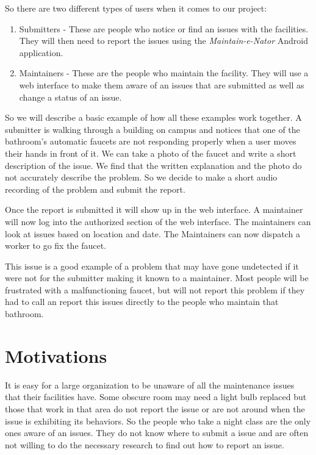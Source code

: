 \documentclass{acm_proc_article-sp}
\begin{document}
So there are two different types of users when it comes to our project:
\vspace{-7mm}
\begin{enumerate}[itemsep=2mm]
\item Submitters - These are people who notice or find an issues with the facilities. They will then need to report the issues using the \textit{Maintain-e-Nator} Android application.
\item Maintainers - These are the people who maintain the facility. They will use a web interface to make them aware of an issues that are submitted as well as change a status of an issue.
\end{enumerate}

So we will describe a basic example of how all these examples work together. A submitter is walking through a building on campus and notices that one of the bathroom's automatic faucets are not responding properly when a user moves their hands in front of it. We can take a photo of the faucet and write a short description of the issue. We find that the written explanation and the photo do not accurately describe the problem. So we decide to make a short audio recording of the problem and submit the report.

Once the report is submitted it will show up in the web interface. A maintainer will now log into the authorized section of the web interface. The maintainers can look at issues based on location and date. The Maintainers can now dispatch a worker to go fix the faucet. 

This issue is a good example of a problem that may have gone undetected if it were not for the submitter making it known to a maintainer. Most people will be frustrated with a malfunctioning faucet, but will not report this problem if they had to call an report this issues directly to the people who maintain that bathroom. 

\section{Motivations}
It is easy for a large organization to be unaware of all the maintenance issues that their facilities have. Some obscure room may need a light bulb replaced but those that work in that area do not report the issue or are not around when the issue is exhibiting its behaviors.  So the people who take a night class are the only ones aware of an issues.  They do not know where to submit a issue and are often not willing to do the necessary research to find out how to report an issue.
\end{document}
